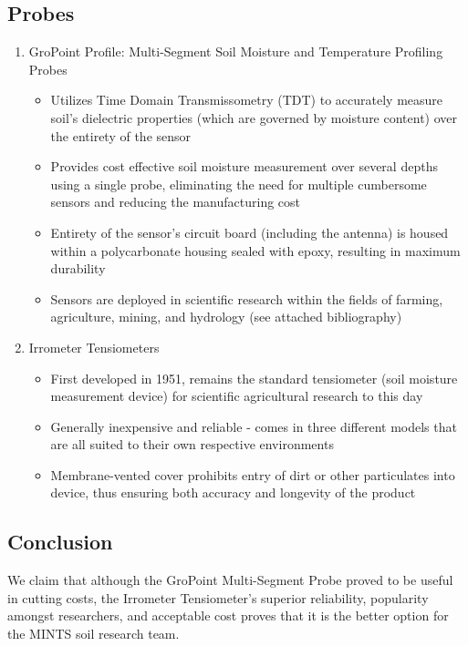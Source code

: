 \documentclass{article}
\begin{document}
\subsection{Probes}
\begin{enumerate}
\item GroPoint Profile: Multi-Segment Soil Moisture and Temperature Profiling Probes
\begin{itemize}
    \item Utilizes Time Domain Transmissometry (TDT) to accurately measure soil's dielectric properties (which are governed by moisture content) over the entirety of the sensor 
    \item Provides cost effective soil moisture measurement over several depths using a single probe, eliminating the need for multiple cumbersome sensors and reducing the manufacturing cost
    \item Entirety of the sensor's circuit board (including the antenna) is housed within a polycarbonate housing sealed with epoxy, resulting in maximum durability
    \item Sensors are deployed in scientific research within the fields of farming, agriculture, mining, and hydrology (see attached bibliography)
\end{itemize}

\item Irrometer Tensiometers
\begin{itemize}
    \item First developed in 1951, remains the standard tensiometer (soil moisture measurement device) for scientific agricultural research to this day
    \item Generally inexpensive and reliable - comes in three different models that are all suited to their own respective environments
    \item Membrane-vented cover prohibits entry of dirt or other particulates into device, thus ensuring both accuracy and longevity of the product
\end{itemize}

\end{enumerate}

\subsection{Conclusion}
We claim that although the GroPoint Multi-Segment Probe proved to be useful in cutting costs, the Irrometer Tensiometer's superior reliability, popularity amongst researchers, and acceptable cost proves that it is the better option for the MINTS soil research team.
\end{document}
